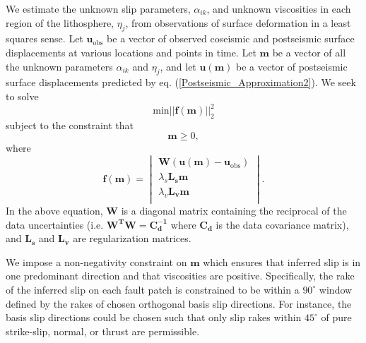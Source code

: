 We estimate the unknown slip parameters, $\alpha_{ik}$, and unknown
viscosities in each region of the lithosphere, $\eta_j$, from
observations of surface deformation in a least squares sense. Let
$\mathbf{u_{\mathrm{obs}}}$ be a vector of observed coseismic and
postseismic surface displacements at various locations and points in
time.  Let $\mathbf{m}$ be a vector of all the unknown parameters
$\alpha_{ik}$ and $\eta_j$, and let $\mathbf{u(m)}$ be a vector of
postseismic surface displacements predicted by eq.
(\ref{Postseismic_Approximation2}). We seek to solve
\begin{equation}\label{Inverse_Problem}
  \mathrm{min}
  \big|\big|\mathbf{f(m)}\big|\big|_2^2
\end{equation}
subject to the constraint that
\begin{equation}
  \mathbf{m}\geq0,
\end{equation}
where 
\begin{equation}\label{ResidualFunction}
  \mathbf{f(m)} = 
    \begin{vmatrix}
      \mathbf{W\left(u(m)-u_{\mathrm{obs}}\right)}\\
      \lambda_s\mathbf{L_sm}\\
      \lambda_v\mathbf{L_vm}\\
    \end{vmatrix} .
\end{equation}  
In the above equation, $\mathbf{W}$ is a diagonal matrix containing the
reciprocal of the data uncertainties
(i.e. $\mathbf{W^TW}=\mathbf{C_d^{-1}}$ where $\mathbf{C_d}$ is
the data covariance matrix), and $\mathbf{L_s}$ and $\mathbf{L_v}$ are
regularization matrices.

We impose a non-negativity constraint on $\mathbf{m}$ which ensures that
inferred slip is in one predominant direction and that viscosities are
positive.  Specifically, the rake of the inferred slip on each fault
patch is constrained to be within a $90^\circ$ window defined by the
rakes of chosen orthogonal basis slip directions. For instance, the
basis slip directions could be chosen such that only slip rakes within
$45^\circ$ of pure strike-slip, normal, or thrust are permissible.


